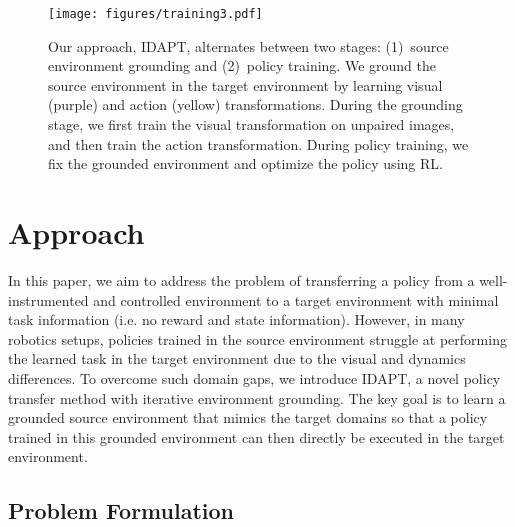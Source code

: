 \begin{figure*}[t]
    \centering
    \texttt{[image: figures/training3.pdf]}
    \caption{
        Our approach, IDAPT, alternates between two stages: (1)~source environment grounding and (2)~policy training. We ground the source environment in the target environment by learning visual (purple) and action (yellow) transformations. During the grounding stage, we first train the visual transformation on unpaired images, and then train the action transformation.  During policy training, we fix the grounded environment and optimize the policy using RL.
    }
    \label{fig:training}
\end{figure*}


\section{Approach}

In this paper, we aim to address the problem of transferring a policy from a well-instrumented and controlled environment to a target environment with minimal task information (i.e. no reward and state information). However, in many robotics setups, policies trained in the source environment struggle at performing the learned task in the target environment due to the visual and dynamics differences. To overcome such domain gaps, we introduce IDAPT, a novel policy transfer method with iterative environment grounding. The key goal is to learn a grounded source environment that mimics the target domains so that a policy trained in this grounded environment can then directly be executed in the target environment.



\subsection{Problem Formulation}
\label{sec:problem_formulation}

